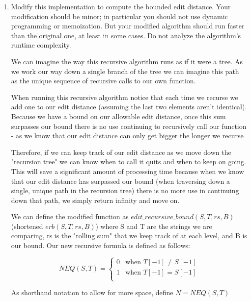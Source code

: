 \documentclass[11pt, letterpaper]{article}
\begin{document}
\begin{enumerate}
\item Modify this implementation to compute the bounded edit distance. Your modification should be minor; in particular you should not use dynamic programming or memoization. But your modified algorithm should run faster than the original one, at least in some cases. Do not analyze the algorithm's runtime complexity.

\quad We can imagine the way this recursive algorithm runs as if it were a tree. As we work our way down a single branch of the tree we can imagine this path as the unique sequence of recursive calls to our own function. 

\quad When running this recursive algorithm notice that each time we recurse we add one to our edit distance (assuming the last two elements aren't identical). Because we have a bound on our allowable edit distance, once this sum surpasses our bound there is no use continuing to recursively call our function - as we know that our edit distance can only get bigger the longer we recurse

\quad Therefore, if we can keep track of our edit distance as we move down the "recursion tree" we can know when to call it quits and when to keep on going. This will save a significant amount of processing time because when we know that our edit distance has surpassed our bound (when traversing down a single, unique path in the recursion tree) there is no more use in continuing down that path, we simply return infinity and move on.

\quad We can define the modified function as $edit\_recursive\_bound(S, T, rs, B)$ (shortened $erb(S, T, rs, B)$) where S and T are the strings we are comparing, rs is the "rolling sum" that we keep track of at each level, and B is our bound. Our new recursive formula is defined as follows:

\[
NEQ(S, T) =
\begin{cases}
0 & \text{when } T[-1] \neq S[-1] \\
1 & \text{when } T[-1] = S[-1] \\
\end{cases}
\]

\begin{center}
As shorthand notation to allow for more space, define $N = NEQ(S, T)$
\end{center}


\end{enumerate}
\end{document}
